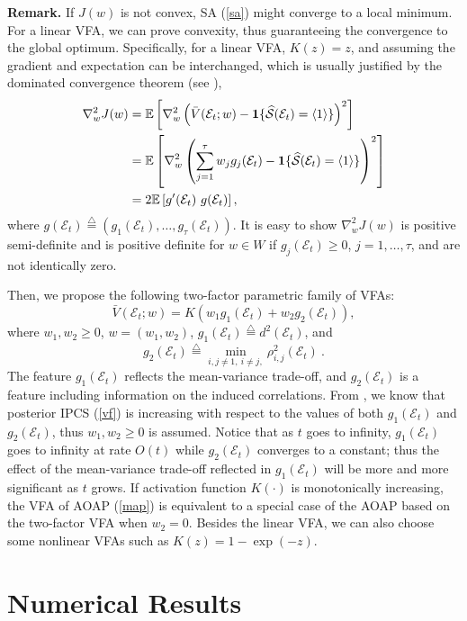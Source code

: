 \documentclass[journal]{IEEEtran}
\newcommand{\ed}{\stackrel{\triangle}{=}}
\begin{document}
  \noindent\textbf{Remark.} If $J(w)$ is not convex, SA  (\ref{sa}) might converge to a local minimum. 
  For a linear VFA, we can prove convexity, thus guaranteeing the convergence to the global optimum. Specifically, for a  linear VFA, $K(z)=z$, and assuming the gradient and expectation can be interchanged, which is usually justified by the dominated convergence theorem (see \cite{rudin1987real}), 
  \begin{align*}\nabla_{w}^2 J(w)&=\mathbb{E}\left[\nabla_w^2 \left(\bar{V}(\mathcal{E}_t;w)-{\bf1}\{ \widehat{\mathcal{S}}(\mathcal{E}_t)=\langle 1 \rangle \}\right)^2 \right]\\
  &=\mathbb{E}\left[\nabla_w^2 \left(\sum_{j=1}^{\tau} w_j g_j(\mathcal{E}_t)-{\bf1}\{ \widehat{\mathcal{S}}(\mathcal{E}_t)=\langle 1 \rangle \}\right)^2 \right]\\
  &=2\mathbb{E}\left[ g'(\mathcal{E}_t) ~ g(\mathcal{E}_t) \right],\end{align*}
  where $g(\mathcal{E}_t)\ed (g_1(\mathcal{E}_t),\ldots,g_{\tau}(\mathcal{E}_t))$. It is easy to show $\nabla_{w}^2 J(w)$ is positive semi-definite and is positive definite for $w\in W$ if $g_j(\mathcal{E}_t)\geq 0$, $j=1,\ldots,\tau$, and are not identically zero. 
  
   Then, we propose the following two-factor parametric family of VFAs: 
  $$\bar{V}(\mathcal{E}_t;w)= K\left(w_1 g_1(\mathcal{E}_t)+w_2 g_2(\mathcal{E}_t)\right),$$
  where $w_1,w_2\geq 0$, $w=(w_1,w_2)$, 
  $g_1(\mathcal{E}_t)\ed d^2(\mathcal{E}_t)$, and 
  $$g_2(\mathcal{E}_t)\ed\min_{i,j\neq 1, ~i\neq j,}\rho_{i,j}^2(\mathcal{E}_t)~.$$
The feature  $g_1(\mathcal{E}_t)$ reflects the mean-variance trade-off, and $g_2(\mathcal{E}_t)$ is a feature including information on the induced correlations. From \cite{peng2015nonmonotone}, we know that  posterior IPCS (\ref{vf}) is increasing with respect to the values of both $g_1(\mathcal{E}_t)$ and $g_2(\mathcal{E}_t)$, thus  $w_1,w_2\geq 0$ is assumed. Notice that  as $t$ goes to infinity, $g_1(\mathcal{E}_t)$ goes to infinity at rate $O(t)$ while $g_2(\mathcal{E}_t)$ converges to a constant; thus the effect of the mean-variance trade-off reflected in $g_1(\mathcal{E}_t)$ will be more and more significant as $t$ grows.   If  activation function $K(\cdot)$ is monotonically increasing, the VFA of AOAP (\ref{map}) is equivalent to a special case of the AOAP based on the two-factor VFA when $w_2=0$. Besides the linear VFA,  we can also choose some nonlinear VFAs such as $K(z)=1-\exp(-z)$.
 \section{Numerical Results}\label{nex}
\end{document}
